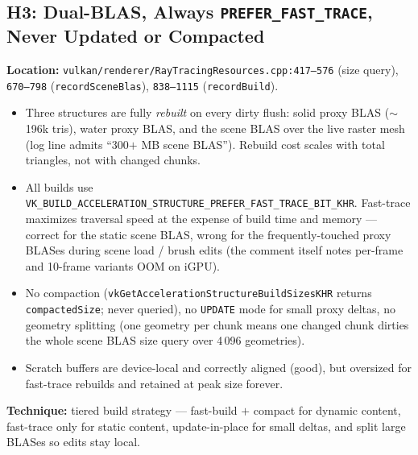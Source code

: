 \documentclass[11pt,a4paper]{article}
\begin{document}
\subsection{H3: Dual-BLAS, Always \texttt{PREFER\_FAST\_TRACE}, Never Updated or Compacted}

\textbf{Location:} \texttt{vulkan/renderer/RayTracingResources.cpp:417--576} (size query), \texttt{670--798} (\texttt{recordSceneBlas}), \texttt{838--1115} (\texttt{recordBuild}).

\begin{itemize}
    \item Three structures are fully \textit{rebuilt} on every dirty flush: solid proxy BLAS ($\sim$196k tris), water proxy BLAS, and the scene BLAS over the live raster mesh (log line admits ``300$+$ MB scene BLAS''). Rebuild cost scales with total triangles, not with changed chunks.
    \item All builds use \texttt{VK\_BUILD\_ACCELERATION\_STRUCTURE\_PREFER\_FAST\_TRACE\_BIT\_KHR}. Fast-trace maximizes traversal speed at the expense of build time and memory --- correct for the static scene BLAS, wrong for the frequently-touched proxy BLASes during scene load / brush edits (the comment itself notes per-frame and 10-frame variants OOM on iGPU).
    \item No compaction (\texttt{vkGetAccelerationStructureBuildSizesKHR} returns \texttt{compactedSize}; never queried), no \texttt{UPDATE} mode for small proxy deltas, no geometry splitting (one geometry per chunk means one changed chunk dirties the whole scene BLAS size query over 4\,096 geometries).
    \item Scratch buffers are device-local and correctly aligned (good), but oversized for fast-trace rebuilds and retained at peak size forever.
\end{itemize}

\textbf{Technique:} tiered build strategy --- fast-build $+$ compact for dynamic content, fast-trace only for static content, update-in-place for small deltas, and split large BLASes so edits stay local.
\end{document}
